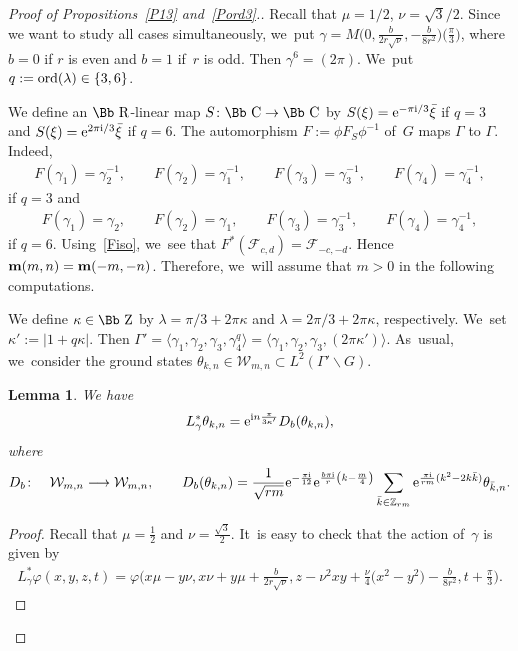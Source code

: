 \documentclass[10pt,a4paper]{amsart}
\newcommand\CC{{\mbox{\Bb C}}}
\newcommand\RR{{\mbox{\Bb R}}}
\newcommand\ZZ{{\mbox{\Bb Z}}}
\newcommand\Z{{\mathbb Z}}
\newcommand\bm{\textbf{{\rm \textbf{m}}}}
\newcommand\cW{{\mathcal W}}
\newcommand\cF{{\mathcal F}}
\newcommand\ph{\varphi}
\newcommand{\ord}{{\rm ord}}
\newcommand\la{\langle}
\newcommand\ra{\rangle}
\numberwithin{equation}{section}
\newtheorem{Lemma}[Theorem]{Lemma}
\begin{document}
\begin{proof}[Proof of Propositions~\ref{P13} and~\ref{Pord3}.] Recall that $\mu=1/2$, $\nu=\sqrt 3/2$.
Since we want to study all cases simultaneously, we~put $\gamma= M\big(0,\frac{b}{2r\sqrt\nu},-\frac{b}{8r^2}\big)\big(\frac{\pi}{3}\big)$,
where $b=0$ if $r$ is even and $b=1$ if~$r$ is odd.
Then $\gamma^6=(2\pi)$. We~put $q:=\ord(\lambda)\in\{3,6\}$.

We define an $\RR$-linear map $S\colon \CC\to\CC$ by $S(\xi)={\rm e}^{-\pi {\rm i}/3}\bar \xi$ if $q=3$ and $S(\xi)={\rm e}^{2\pi {\rm i}/3}\bar\xi$ if $q=6$. The automorphism $F:=\phi F_S\phi^{-1}$ of~$G$ maps $\Gamma$ to $\Gamma$. Indeed,
\begin{gather*}
F(\gamma_1)=\gamma_2^{-1},\qquad F(\gamma_2)=\gamma_1^{-1},\qquad F(\gamma_3)=\gamma_3^{-1},\qquad F(\gamma_4)=\gamma_4^{-1},
\end{gather*}
if $q=3$ and
\begin{gather*}
F(\gamma_1)=\gamma_2,\qquad F(\gamma_2)=\gamma_1,\qquad F(\gamma_3)=\gamma_3^{-1},\qquad F(\gamma_4)=\gamma_4^{-1},
\end{gather*}
if $q=6$.
Using~\eqref{Fiso}, we~see that $F^*(\cF_{c,d})=\cF_{-c,-d}$. Hence $\bm(m,n)=\bm(-m,-n)$. Therefore, we~will assume that $m>0$ in the following computations.

We define $\kappa\in\ZZ$ by $\lambda=\pi/3+2\pi\kappa$ and $\lambda=2\pi/3+2\pi\kappa$, respectively. We~set $\kappa':=|1+q\kappa|$. Then $\Gamma'=\la \gamma_1,\gamma_2,\gamma_3,\gamma_4^q\ra=\la \gamma_1,\gamma_2,\gamma_3,(2\pi\kappa')\ra$. As~usual, we~consider the ground states $\theta_{k,n} \in \cW_{m,n}\subset L^2(\Gamma'\backslash G)$.
\begin{Lemma}
We have
\begin{gather*}
L^*_{\gamma} \theta_{k,n} = {\rm e}^{{\rm i}n\frac{\pi}{3\kappa'}} D_b(\theta_{k,n}),
\end{gather*}
where
\begin{gather*}
D_b\colon\quad {\mathcal W}_{m,n}\longrightarrow {\mathcal W}_{m,n}, \qquad D_b(\theta_{k,n})=\frac1{\sqrt{rm}} {\rm e}^{-\frac {\pi {\rm i}}{12}}{\rm e}^{\frac{b\pi {\rm i}}r\left(k-\frac m4\right)}\sum_{\bar k\in \Z_{rm}} {\rm e}^{\frac{\pi {\rm i}}{rm} (k^2-2k\bar k) }\theta_{\bar k,n}.
\end{gather*}
\end{Lemma}

\begin{proof}
Recall that $\mu=\frac{1}{2}$ and $\nu=\frac{\sqrt{3}}{2}$. It~is easy to check that the action of~$\gamma$ is given by
\begin{gather}\label{Ew3}
L^*_{\gamma} \ph(x,y,z,t)=\ph\bigg(\!x \mu -y \nu, x \nu + y\mu+\frac b{2r{\sqrt\nu}}, z -\nu^2 {xy} +\frac\nu4 \big(x^2\!-y^2\big)\!-\frac b{8r^2},t+\frac{\pi}{3}\bigg).
\end{gather}


\end{proof}
\end{proof}
\end{document}
